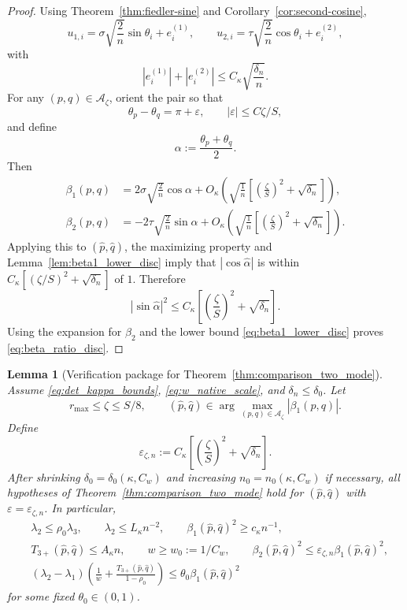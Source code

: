 \documentclass[11pt]{article}
\numberwithin{equation}{section}
\newtheorem{lemma}[theorem]{Lemma}
\theoremstyle{definition}
\theoremstyle{remark}
\begin{document}
\begin{proof}
	Using Theorem~\ref{thm:fiedler-sine} and
	Corollary~\ref{cor:second-cosine},
	\[
	u_{1,i}=
	\sigma\sqrt{\frac2n}\sin\theta_i+e_i^{(1)},
	\qquad
	u_{2,i}=
	\tau\sqrt{\frac2n}\cos\theta_i+e_i^{(2)},
	\]
	with
	\[
	|e_i^{(1)}|+|e_i^{(2)}|
	\le
	C_\kappa\sqrt{\frac{\delta_n}{n}}.
	\]
	For any $(p,q)\in\mathcal A_\zeta$, orient the pair so that
	\[
	\theta_p-\theta_q=\pi+\varepsilon,
	\qquad
	|\varepsilon|\le C\zeta/S,
	\]
	and define
	\[
	\alpha:=\frac{\theta_p+\theta_q}{2}.
	\]
	Then
	\begin{align*}
		\beta_1(p,q)
		&=
		2\sigma\sqrt{\frac2n}\cos\alpha
		+
		O_\kappa\!\left(
		\sqrt{\frac1n}\left[
		\left(\frac{\zeta}{S}\right)^2+\sqrt{\delta_n}
		\right]\right),\\
		\beta_2(p,q)
		&=
		-2\tau\sqrt{\frac2n}\sin\alpha
		+
		O_\kappa\!\left(
		\sqrt{\frac1n}\left[
		\left(\frac{\zeta}{S}\right)^2+\sqrt{\delta_n}
		\right]\right).
	\end{align*}
	Applying this to $(\widehat p,\widehat q)$, the maximizing property and
	Lemma~\ref{lem:beta1_lower_disc} imply that
	$|\cos\widehat\alpha|$ is within
	$C_\kappa[(\zeta/S)^2+\sqrt{\delta_n}]$ of $1$. Therefore
	\[
	|\sin\widehat\alpha|^2
	\le
	C_\kappa\left[
	\left(\frac{\zeta}{S}\right)^2+\sqrt{\delta_n}
	\right].
	\]
	Using the expansion for $\beta_2$ and the lower bound
	\eqref{eq:beta1_lower_disc} proves \eqref{eq:beta_ratio_disc}.
\end{proof}

\begin{lemma}[Verification package for Theorem~\ref{thm:comparison_two_mode}]\label{lem:verify_abstract_chord}
	Assume \eqref{eq:det_kappa_bounds}, \eqref{eq:w_native_scale}, and
	$\delta_n\le \delta_0$. Let
	\[
	r_{\max}\le \zeta\le S/8,
	\qquad
	(\widehat p,\widehat q)\in
	\arg\max_{(p,q)\in\mathcal A_\zeta}|\beta_1(p,q)|.
	\]
	Define
	\begin{equation}\label{eq:eps_zn}
		\varepsilon_{\zeta,n}:=
		C_\kappa\left[
		\left(\frac{\zeta}{S}\right)^2+\sqrt{\delta_n}
		\right].
	\end{equation}
	After shrinking $\delta_0=\delta_0(\kappa,C_w)$ and increasing
	$n_0=n_0(\kappa,C_w)$ if necessary, all hypotheses of
	Theorem~\ref{thm:comparison_two_mode} hold for
	$(\widehat p,\widehat q)$ with $\varepsilon=\varepsilon_{\zeta,n}$.
	In particular,
	\begin{align}
		&\lambda_2\le \rho_0\lambda_3,
		\qquad
		\lambda_2\le L_\kappa n^{-2},
		\qquad
		\beta_1(\widehat p,\widehat q)^2\ge c_\kappa n^{-1},
		\label{eq:verify_first}\\
		&T_{3+}(\widehat p,\widehat q)\le A_\kappa n,
		\qquad
		w\ge w_0:=1/C_w,
		\qquad
		\beta_2(\widehat p,\widehat q)^2
		\le
		\varepsilon_{\zeta,n}\beta_1(\widehat p,\widehat q)^2,
		\label{eq:verify_second}\\
		&(\lambda_2-\lambda_1)\left(
		\frac1w+\frac{T_{3+}(\widehat p,\widehat q)}{1-\rho_0}
		\right)
		\le \theta_0\beta_1(\widehat p,\widehat q)^2
		\label{eq:verify_dominance}
	\end{align}
	for some fixed $\theta_0\in(0,1)$.
\end{lemma}
\end{document}
